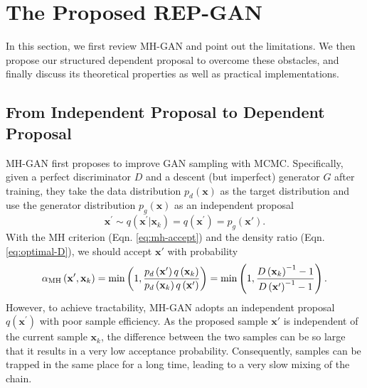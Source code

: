 \documentclass{article} %
\newcommand{\bx}{\mathbf{x}}
\newcommand{\<}{\left\langle}
\renewcommand{\>}{\right\rangle}
\begin{document}
\section{The Proposed REP-GAN}
\label{sec:emhgan}
In this section, we first review MH-GAN and point out the limitations. We then propose our structured dependent proposal to overcome these obstacles, and finally discuss its theoretical properties as well as practical implementations.

\subsection{From Independent Proposal to Dependent Proposal}

MH-GAN \citep{turner2019metropolis} first proposes to improve GAN sampling with MCMC. Specifically, given a perfect discriminator $D$ and a descent (but imperfect) generator $G$ after training, they take the data distribution $p_d(\bx)$ as the target distribution and use the generator distribution $p_g(\bx)$ as an independent proposal
\begin{equation}
\mathbf{x}^{\prime} \sim q\left(\mathbf{x}^{\prime} | \mathbf{x}_{k}\right)=q\left(\mathbf{x}^{\prime}\right)=p_g(\bx').
\label{eq:independence-proposal}
\end{equation}
With the MH criterion (Eqn. \eqref{eq:mh-accept}) and the density ratio (Eqn. \eqref{eq:optimal-D}), we should accept $\bx'$
with probability
\begin{equation}
\alpha_{\rm MH}\left(\mathbf{x}^{\prime}, \mathbf{x}_{k}\right)=\min \left(1, \frac{p_d\left(\mathbf{x}^{\prime}\right) q\left(\mathbf{x}_{k}\right)}{p_d\left(\mathbf{x}_{k}\right) q\left(\mathbf{x}^{\prime}\right)}\right)=\min \left(1, \frac{D\left(\mathbf{x}_{k}\right)^{-1}-1}{D\left(\mathbf{x}^{\prime}\right)^{-1}-1}\right).
\label{eq:mhgan-alpha}
\end{equation}
However, to achieve tractability, MH-GAN adopts an independent proposal $q(\bx^\prime)$ with poor sample efficiency. As the proposed sample $\bx'$ is independent of the current sample $\bx_k$, the difference between the two samples can be so large that it results in a very low acceptance probability. Consequently, samples can be trapped in the same place for a long time, leading to a very slow mixing of the chain. 
\end{document}

